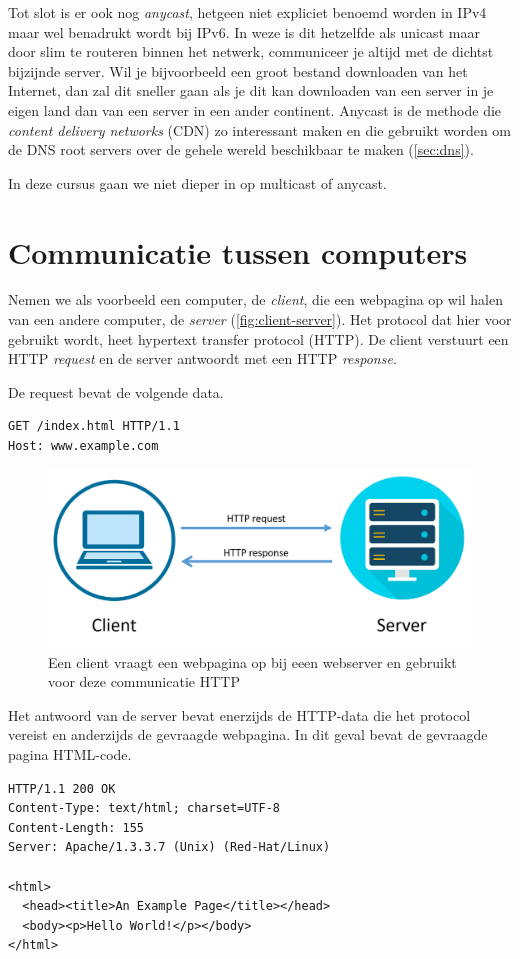 Tot slot is er ook nog \emph{anycast}, hetgeen niet expliciet benoemd worden in IPv4 maar wel benadrukt wordt bij IPv6.
In weze is dit hetzelfde als unicast maar door slim te routeren binnen het netwerk, communiceer je altijd met de dichtst bijzijnde server.
Wil je bijvoorbeeld een groot bestand downloaden van het Internet, dan zal dit sneller gaan als je dit kan downloaden van een server in je eigen land dan van een server in een ander continent.
Anycast is de methode die \emph{content delivery networks} (CDN) zo interessant maken en die gebruikt worden om de DNS root servers over de gehele wereld beschikbaar te maken (\vref{sec:dns}).

In deze cursus gaan we niet dieper in op multicast of anycast.



\section{Communicatie tussen computers}

Nemen we als voorbeeld een computer, de \emph{client}, die een webpagina op wil halen van een andere computer, de \emph{server} (\vref{fig:client-server}).
Het protocol dat hier voor gebruikt wordt, heet hypertext transfer protocol (HTTP).
De client verstuurt een HTTP \emph{request} en de server antwoordt met een HTTP \emph{response}.

De request bevat de volgende data.
\begin{verbatim}
GET /index.html HTTP/1.1
Host: www.example.com
\end{verbatim}

\begin{figure}
   \centering
   \includegraphics[width=.65\textwidth]{images/http-request.png}
   \caption{Een client vraagt een webpagina op bij eeen webserver en gebruikt voor deze communicatie HTTP}
   \label{fig:client-server}
\end{figure}

Het antwoord van de server bevat enerzijds de HTTP-data die het protocol vereist en anderzijds de gevraagde webpagina.
In dit geval bevat de gevraagde pagina HTML-code.
\begin{verbatim}
HTTP/1.1 200 OK
Content-Type: text/html; charset=UTF-8
Content-Length: 155
Server: Apache/1.3.3.7 (Unix) (Red-Hat/Linux)

<html>
  <head><title>An Example Page</title></head>
  <body><p>Hello World!</p></body>
</html>
\end{verbatim}

